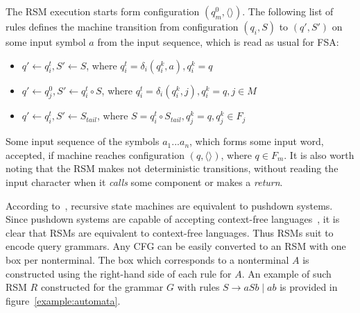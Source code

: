 The RSM execution starts form configuration $(q_m^0, \langle\rangle)$. 
The following list of rules defines the machine transition from configuration $(q_i,S)$ to $(q',S')$ on some input symbol $a$ from the input sequence, which is read as usual for FSA:

\begin{itemize}
    \item $q' \gets q_i^t, S' \gets S$, where $q_i^t = \delta_i (q_i^k, a), q_i^k = q$
    \item $q' \gets q_j^0, S' \gets q_i^t \circ S$, where $q_i^t = \delta_i (q_i^k, j),  q_i^k = q, j \in M$
    \item $q' \gets q_i^t, S' \gets S_{tail}$, where $S = q_i^t \circ S_{tail}, q_j^k = q, q_j^k \in F_j$
\end{itemize}

Some input sequence of the symbols $a_1 ... a_n$, which forms some input word, accepted, if machine reaches configuration $(q,\langle\rangle)$, where $q \in F_m$. It is also worth noting that the  RSM makes not deterministic transitions, without reading the input character when it \textit{calls} some component or makes a \textit{return}.



According to~\cite{rsm:analysis:10.1007/3-540-44585-4_18}, recursive state machines are equivalent to pushdown systems.
Since pushdown systems are capable of accepting context-free languages~\cite{automata:theory:10.5555/1177300}, it is clear that RSMs are equivalent to context-free languages.
Thus RSMs suit to encode query grammars.
Any CFG can be easily converted to an RSM with one box per nonterminal.
The box which corresponds to a nonterminal $A$ is constructed using the right-hand side of each rule for $A$.
An example of such RSM $R$ constructed for the grammar $G$ with rules $S \to a S b \mid a b$ is provided in figure~\ref{example:automata}.

